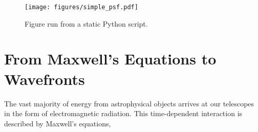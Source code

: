 \documentclass[letterpaper]{ar-1col}
\begin{document}
\begin{figure}[ht]
  \centering
  \texttt{[image: figures/simple\_psf.pdf]}
  \caption{Figure run from a static Python script.}
  \label{fig:simplepsf}
\end{figure}





\section{From Maxwell's Equations to Wavefronts}\label{sec:maxwell}
The vast majority of energy from astrophysical objects arrives at our telescopes in the form of electromagnetic radiation.
%
%
This time-dependent interaction is described by Maxwell's equations,
\end{document}
